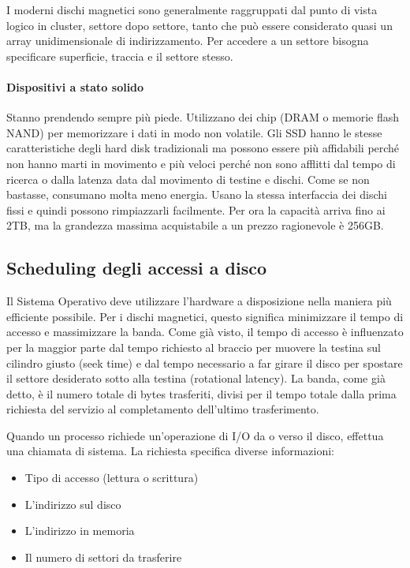 \documentclass[a4paper]{article}
\begin{document}
I moderni dischi magnetici sono generalmente raggruppati dal punto di vista logico in cluster, settore dopo settore, tanto che può essere considerato quasi un array unidimensionale di indirizzamento. Per accedere a un settore bisogna specificare superficie, traccia e il settore stesso.

\paragraph{Dispositivi a stato solido}
Stanno prendendo sempre più piede. Utilizzano dei chip (DRAM o memorie flash NAND) per memorizzare i dati in modo non volatile. Gli SSD hanno le stesse caratteristiche degli hard disk tradizionali ma possono essere più affidabili perché non hanno marti in movimento e più veloci perché non sono afflitti dal tempo di ricerca o dalla latenza data dal movimento di testine e dischi. Come se non bastasse, consumano molta meno energia. Usano la stessa interfaccia dei dischi fissi e quindi possono rimpiazzarli facilmente. Per ora la capacità arriva fino ai 2TB, ma la grandezza massima acquistabile a un prezzo ragionevole è 256GB.

\subsection{Scheduling degli accessi a disco}
Il Sistema Operativo deve utilizzare l'hardware a disposizione nella maniera più efficiente possibile. Per i dischi magnetici, questo significa minimizzare il tempo di accesso e massimizzare la banda. Come già visto, il tempo di accesso è influenzato per la maggior parte dal tempo richiesto al braccio per muovere la testina sul cilindro giusto (seek time) e dal tempo necessario a far girare il disco per spostare il settore desiderato sotto alla testina (rotational latency). La banda, come già detto, è il numero totale di bytes trasferiti, divisi per il tempo totale dalla prima richiesta del servizio al completamento dell'ultimo trasferimento.

Quando un processo richiede un'operazione di I/O da o verso il disco, effettua una chiamata di sistema. La richiesta specifica diverse informazioni:
\begin{itemize}
   \item Tipo di accesso (lettura o scrittura)
   \item L'indirizzo sul disco
   \item L'indirizzo in memoria
   \item Il numero di settori da trasferire
\end{itemize}
\end{document}
